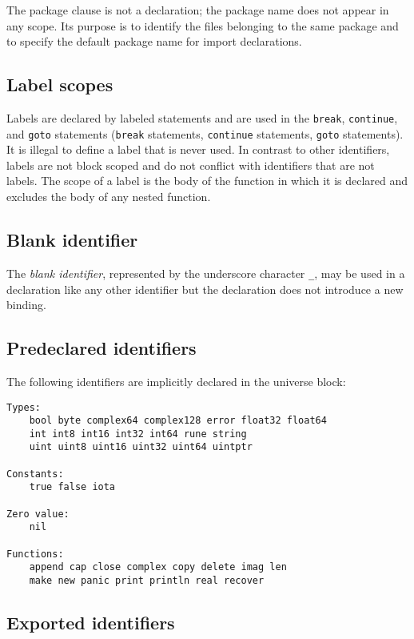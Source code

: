 The package clause is not a declaration; the
package name does not appear in any scope. Its purpose is to identify
the files belonging to the same package and to
specify the default package name for import declarations.

\subsection*{Label scopes}

Labels are declared by labeled statements and are used in the
\texttt{break}, \texttt{continue}, and \texttt{goto} statements
(\texttt{break} statements, \texttt{continue} statements,
\texttt{goto} statements). It is illegal to define a label that is never
used. In contrast to other identifiers, labels are not block scoped
and do not conflict with identifiers that are not labels. The scope
of a label is the body of the function in which it is declared and
excludes the body of any nested function.

\subsection*{Blank identifier}

The \emph{blank identifier}, represented by the underscore character
\texttt{\_}, may be used in a declaration like any other identifier but
the declaration does not introduce a new binding.

\subsection*{Predeclared identifiers}

The following identifiers are implicitly declared in the
universe block:

\begin{Verbatim}[frame=single]
Types:
    bool byte complex64 complex128 error float32 float64
    int int8 int16 int32 int64 rune string
    uint uint8 uint16 uint32 uint64 uintptr

Constants:
    true false iota

Zero value:
    nil

Functions:
    append cap close complex copy delete imag len
    make new panic print println real recover
\end{Verbatim}

\subsection*{Exported identifiers}

